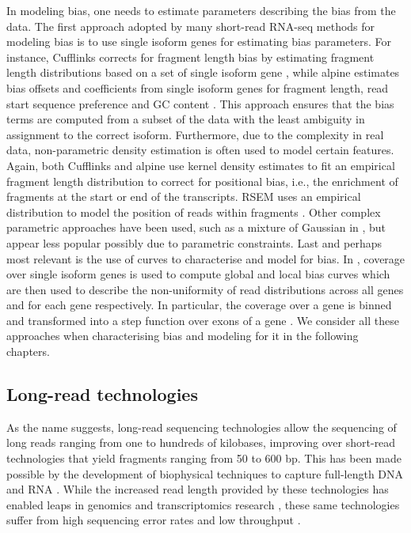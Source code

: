 In modeling bias, one needs to estimate parameters describing the bias from the data. The first approach adopted by many short-read RNA-seq methods for modeling bias is to use single isoform genes for estimating bias parameters. For instance, 
Cufflinks corrects for fragment length bias by estimating fragment length distributions based on a set of single isoform gene \cite{Roberts2011}, while alpine  estimates bias offsets and coefficients from single isoform genes for fragment length, read start sequence preference and GC content \cite{Love2016}. This approach ensures that the bias terms are computed from a subset of the data with the least ambiguity in assignment to the correct isoform. Furthermore, due to the complexity in real data, non-parametric density estimation is often used to model certain features. Again, both Cufflinks and alpine use kernel density estimates to fit an empirical fragment length distribution to correct for positional bias, i.e., the enrichment of fragments at the start or end of the transcripts. RSEM uses an empirical distribution to model the position of reads within fragments \cite{Li2011}. Other complex parametric approaches have been used, such as a mixture of Gaussian in \cite{MIXMIX}, but appear less popular possibly due to parametric constraints. Last and perhaps most relevant is the use of curves to characterise and model for bias. In \cite{NURD}, coverage over single isoform genes is used to compute global and local bias curves which are then used to describe the non-uniformity of read distributions across all genes and for each gene respectively. In particular, the coverage over a gene is binned and transformed into a step function over exons of a gene \cite{NURD}. We consider all these approaches when characterising bias and modeling for it in the following chapters. 

\subsection{Long-read technologies}

As the name suggests, long-read sequencing technologies allow the sequencing of long reads ranging from one to hundreds of kilobases, improving over short-read technologies that yield fragments ranging from 50 to 600 bp. This has been made possible by the development of biophysical techniques to capture full-length DNA and RNA \cite{Weirather2017}. While the increased read length provided by these technologies has enabled leaps in genomics and transcriptomics research \cite{Bolisetty2015, Byrne2017, DeCoster2019, Liu2019, Mantere2019, Nurk2021}, these same technologies suffer from high sequencing error rates and low throughput \cite{Carneiro2012, Reuter2015, Jain2015}.  

